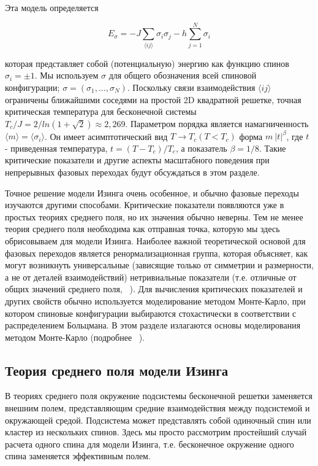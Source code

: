 \documentclass[11pt]{article}
\begin{document}
Эта модель определяется

\begin{equation}
E_\sigma = -J\sum\limits_{\langle ij \rangle}\sigma_i \sigma_j - h\sum\limits_{j=1}^N \sigma_i
\label{eq_28}
\end{equation}

которая представляет собой (потенциальную) энергию как функцию спинов $\sigma_i= \pm 1$. Мы используем $\sigma$ для общего обозначения всей спиновой конфигурации; $\sigma = (\sigma_1, \dots,\sigma_N)$. Поскольку связи взаимодействия $\langle ij \rangle$ ограничены ближайшими соседями на простой 2D квадратной решетке, точная критическая температура для бесконечной системы $T_c/J = 2 / ln (1 + \sqrt 2) \approx 2,269 $.
 Параметром порядка является намагниченность $\langle m \rangle = \langle \sigma_i \rangle $. 
 Он имеет асимптотический вид $T → T_c (T <T_c)$ форма $m ~ |t|^\beta$, где $t$ - приведенная температура, $t = (T - T_c) / T_c$, а показатель $\beta = 1/8$. Такие критические показатели и другие аспекты масштабного поведения при непрерывных фазовых переходах будут обсуждаться в этом разделе.

Точное решение модели Изинга очень особенное, и обычно фазовые переходы изучаются другими способами. Критические показатели появляются уже в простых теориях среднего поля, но их значения обычно неверны. Тем не менее теория среднего поля необходима как отправная точка, которую мы здесь обрисовываем для модели Изинга. Наиболее важной теоретической основой для фазовых переходов является ренормализационная группа, которая объясняет, как могут возникнуть универсальные (зависящие только от симметрии и размерности, а не от деталей взаимодействий) нетривиальные показатели (т.е. отличные от общих значений среднего поля,  ~\cite{cardy}). Для вычисления критических показателей и других свойств обычно используется моделирование методом Монте-Карло, при котором спиновые конфигурации выбираются стохастически в соответствии с распределением Больцмана. В этом разделе излагаются основы моделирования методом Монте-Карло (подробнее ~\cite{Landau_Binder, Newman_Barkema}). 

\subsection{Теория среднего поля модели Изинга}
В теориях среднего поля окружение подсистемы бесконечной решетки заменяется внешним полем, представляющим средние взаимодействия между подсистемой и окружающей средой. Подсистема может представлять собой одиночный спин или кластер из нескольких спинов. Здесь мы просто рассмотрим простейший случай расчета одного спина для модели Изинга, т.е. бесконечное окружение одного спина заменяется эффективным полем.
\end{document}
